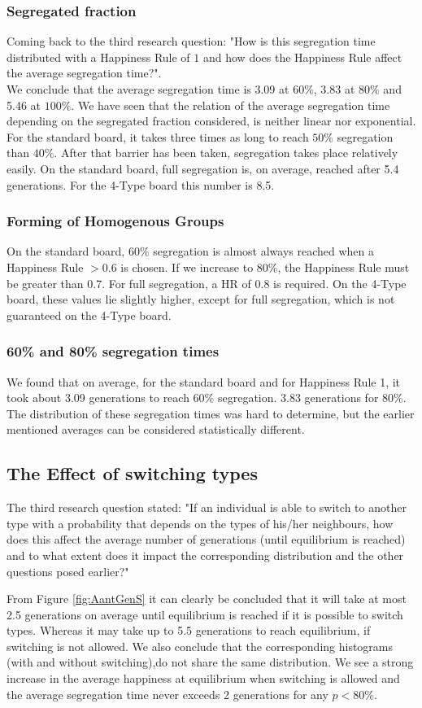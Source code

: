 \subsubsection*{Segregated fraction}
Coming back to the third research question: "How is this segregation time distributed with a Happiness Rule of \(1\) and how does the Happiness Rule affect the average segregation time?".\\
We conclude that the average segregation time  is 3.09 at \(60\%\), 3.83 at \(80\%\) and 5.46 at \(100\%\).
We have seen that the relation of the average segregation time depending on the segregated fraction considered, is neither linear nor exponential. For the standard board, it takes three times as long to reach $50\%$ segregation than $40\%$. After that barrier has been taken, segregation takes place relatively easily. On the standard board, full segregation is, on average, reached after 5.4 generations. For the 4-Type board this number is 8.5.

\subsubsection*{Forming of Homogenous Groups}
On the standard board, $60\%$ segregation is almost always reached when a Happiness Rule $>0.6$ is chosen. If we increase to $80\%$, the Happiness Rule must be greater than 0.7. For full segregation, a HR of 0.8 is required. On the 4-Type board, these values lie slightly higher, except for full segregation, which is not guaranteed on the 4-Type board.

\subsubsection*{60\% and 80\% segregation times}
We found that on average, for the standard board and for Happiness Rule 1, it took about 3.09 generations to reach $60\%$ segregation. 3.83 generations for $80\%$. The distribution of these segregation times was hard to determine, but the earlier mentioned averages can be considered statistically different.

\subsection{The Effect of switching types}
The third research question stated: "If an individual is able to switch to another type with a probability that depends on the types of his/her neighbours, how does this affect the average number of generations (until equilibrium is reached) and to what extent does it impact the corresponding distribution and the other questions posed earlier?"

From Figure \ref{fig:AantGenS} it can clearly be concluded that it will take at most 2.5 generations on average until equilibrium is reached if it is possible to switch types. Whereas it may take up to 5.5 generations to reach equilibrium, if switching is not allowed. We also conclude that the corresponding histograms (with and without switching),do not share the same distribution.
We see a strong increase in the average happiness at equilibrium when switching is allowed and the average segregation time never exceeds 2 generations for any \(p<80\%\).